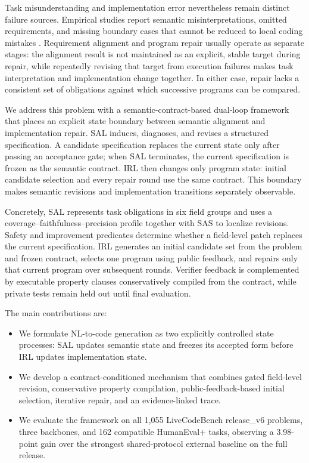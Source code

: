 \documentclass{article}
\begin{document}
Task misunderstanding and implementation error nevertheless remain distinct failure sources. Empirical studies report semantic misinterpretations, omitted requirements, and missing boundary cases that cannot be reduced to local coding mistakes \citep{ref_bug_study,ref_codegen_error_taxonomy,ref_nl_spec_verification_failure}. Requirement alignment and program repair usually operate as separate stages: the alignment result is not maintained as an explicit, stable target during repair, while repeatedly revising that target from execution failures makes task interpretation and implementation change together. In either case, repair lacks a consistent set of obligations against which successive programs can be compared.

We address this problem with a semantic-contract-based dual-loop framework that places an explicit state boundary between semantic alignment and implementation repair. SAL induces, diagnoses, and revises a structured specification. A candidate specification replaces the current state only after passing an acceptance gate; when SAL terminates, the current specification is frozen as the semantic contract. IRL then changes only program state: initial candidate selection and every repair round use the same contract. This boundary makes semantic revisions and implementation transitions separately observable.

Concretely, SAL represents task obligations in six field groups and uses a coverage--faithfulness--precision profile together with SAS to localize revisions. Safety and improvement predicates determine whether a field-level patch replaces the current specification. IRL generates an initial candidate set from the problem and frozen contract, selects one program using public feedback, and repairs only that current program over subsequent rounds. Verifier feedback is complemented by executable property clauses conservatively compiled from the contract, while private tests remain held out until final evaluation.

The main contributions are:
\begin{itemize}
    \item We formulate NL-to-code generation as two explicitly controlled state processes: SAL updates semantic state and freezes its accepted form before IRL updates implementation state.
    \item We develop a contract-conditioned mechanism that combines gated field-level revision, conservative property compilation, public-feedback-based initial selection, iterative repair, and an evidence-linked trace.
    \item We evaluate the framework on all 1,055 LiveCodeBench release\_v6 problems, three backbones, and 162 compatible HumanEval+ tasks, observing a 3.98-point gain over the strongest shared-protocol external baseline on the full release.
\end{itemize}
\end{document}
